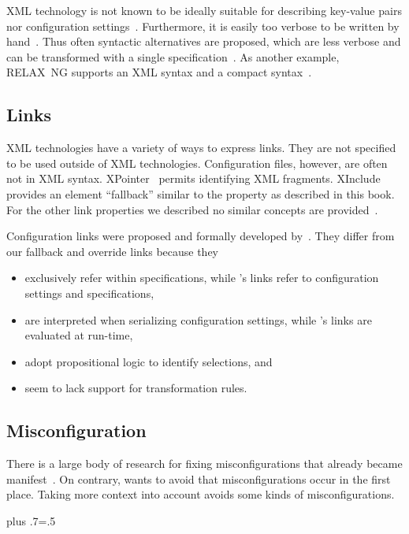 XML technology is not known to be ideally suitable for describing key-value pairs nor configuration settings~\cite{bray1997xml}.
Furthermore, it is easily too verbose to be written by hand~\cite{brabrand2008dual}.
Thus often syntactic alternatives are proposed, which are less verbose and can be transformed with a single specification~\cite{brabrand2008dual}.
As another example, RELAX~NG supports an XML syntax and a compact syntax~\cite{clark2002relax}.


\subsection{Links}

XML technologies have a variety of ways to express links.
They are not specified to be used outside of XML technologies.
Configuration files, however, are often not in XML syntax.
XPointer~\cite{grosso2003xpointer} permits identifying XML fragments.
XInclude~\cite{marsh2006xml} provides an element ``fallback'' similar to the property  as described in this book.
For the other link properties we described no similar concepts are provided~\cite{raab2015kps}.


Configuration links were proposed and formally developed by~\citet{reiser2009core,reiser2009managing}.
They differ from our fallback and override links because they~\cite{raab2015kps}
\begin{itemize}
\item exclusively refer within specifications, while \elektra{}'s links refer to configuration settings and specifications,
\item are interpreted when serializing configuration settings, while \elektra{}'s links are evaluated at run-time,
\item adopt propositional logic to identify selections, and
\item seem to lack support for transformation rules.
\end{itemize}


\subsection {Misconfiguration}

There is a large body of research for fixing misconfigurations that already became manifest~\cite{yin2011empirical,zhang2013automated,zhang2014configuration,xiong2012range,attariyan2010automating}.
On contrary, \elektra{} wants to avoid that misconfigurations occur in the first place.
Taking more context into account avoids some kinds of misconfigurations.%
{\parfillskip=0pt plus .7\textwidth \emergencystretch=.5\textwidth \par}

